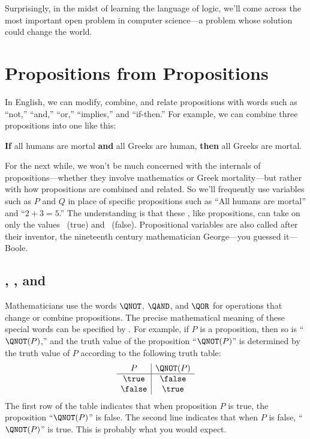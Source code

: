 Surprisingly, in the midst of learning the language of logic, we'll come
across the most important open problem in computer science---a problem
whose solution could change the world.


\section{Propositions from Propositions}\label{propform_sec}

In English, we can modify, combine, and relate propositions with words
such as ``not,'' ``and,'' ``or,'' ``implies,'' and ``if-then.''
For example, we can combine three propositions into one like this:
%
\begin{center}
\textbf{If} all humans are mortal \textbf{and} all Greeks are human,
\textbf{then} all Greeks are mortal.
\end{center}

For the next while, we won't be much concerned with the internals of
propositions---whether they involve mathematics or Greek mortality---but
rather with how propositions are combined and related.  So we'll
frequently use variables such as $P$ and $Q$ in place of specific
propositions such as ``All humans are mortal'' and ``$2 + 3 = 5$.''  The
understanding is that these , like
propositions, can take on only the values \true~(true) and \false~(false).
Propositional variables are also called  after
their inventor, the nineteenth century mathematician George---you guessed
it---Boole.

\subsection{\QNOT, \QAND, and \QOR}
Mathematicians use the words $\QNOT$, $\QAND$, and $\QOR$
for operations that change or combine propositions.  The precise
mathematical meaning of these special words can be specified by
.  For example, if $P$ is a proposition,
then so is ``$\QNOT(P)$,'' and the truth value of the proposition
``$\QNOT(P)$'' is determined by the truth value of $P$ according to the
following truth table:
%
\[
\begin{array}{c|c}
P & \QNOT(P) \\ \hline
\true & \false \\
\false & \true \\
\end{array}
\]
%
The first row of the table indicates that when proposition $P$ is true,
the proposition ``$\QNOT(P)$'' is false.  The second line indicates that
when $P$ is false, ``$\QNOT(P)$'' is true.  This is probably what you
would expect.


